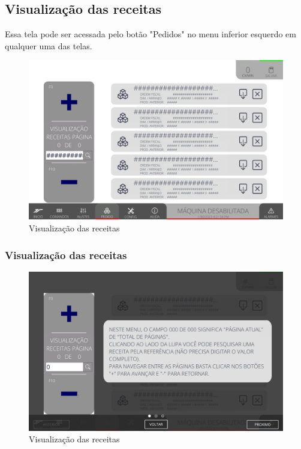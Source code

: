 \thispagestyle{fancy}
\vspace*{40 pt}
\subsection{Visualização das receitas} \label{sec:telaVisualizacaoReceitas}
Essa tela pode ser acessada pelo botão "Pedidos" no menu inferior esquerdo em qualquer uma das telas.
\vspace*{\fill}
\begin{figure}[h]
    \centering
    \includegraphics[width=480 px,height=300 px]{src/imagesICV/09-request/visualization/Tela-Principal.png}
    \caption{Visualização das receitas}
\end{figure}
\vspace*{\fill}


\newpage
\thispagestyle{fancy}
\vspace*{40 pt}
\subsubsection{\small{Visualização das receitas}} \label{sec:telaVisualizacaoReceitasVisualizacaoReceitas}
\vspace*{\fill}
\begin{figure}[h]
    \centering
    \includegraphics[width=576 px,height=360 px]{src/imagesICV/09-request/visualization/e-1.png}
    \caption{Visualização das receitas}
\end{figure}
\vspace*{\fill}

